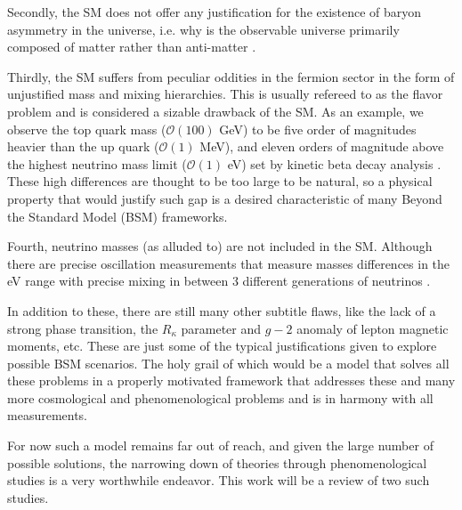 Secondly, the SM does not offer any justification for the existence of baryon asymmetry in the universe, i.e. why is the observable universe primarily composed of matter rather than anti-matter \cite{book_Baryion}. 
%

Thirdly, the SM suffers from peculiar oddities in the fermion sector in the form of unjustified mass and mixing hierarchies. This is usually refereed to as the flavor problem and is considered a sizable drawback of the SM. 
%
As an example, we observe the top quark mass ($\mathcal{O}(100)$ GeV) to be five order of magnitudes heavier than the up quark ($\mathcal{O}(1)$ MeV), and eleven orders of magnitude above the highest neutrino mass limit ($\mathcal{O}(1)$ eV) set by kinetic beta decay analysis \cite{Mertens_2016}.
%
%
These high differences are thought to be too large to be natural, so a physical property that would justify such gap is a desired characteristic of many Beyond the Standard Model (BSM) frameworks. 

Fourth, neutrino masses (as alluded to) are not included in the SM. Although there are precise oscillation measurements that measure masses differences in the eV range with precise mixing in between 3 different generations of neutrinos \cite{PhysRevD.89.013001}. 

In addition to these, there are still many other subtitle flaws, like the lack of a strong phase transition, the $R_{\kappa}$ parameter and $g-2$ anomaly of lepton magnetic moments, etc. 
%
These are just some of the typical justifications given to explore possible BSM scenarios. 
%
The holy grail of which would be a model that solves all these problems in a properly motivated framework that addresses these and many more cosmological and phenomenological problems and is in harmony with all measurements.  

For now such a model remains far out of reach, and given the large number of possible solutions, the narrowing down of theories through phenomenological studies is a very worthwhile endeavor. This work will be a review of two such studies. %

